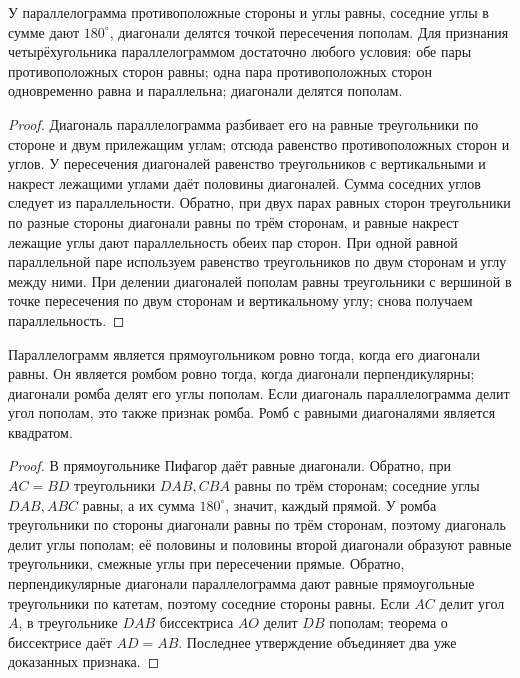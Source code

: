 \begin{theorem}\label{thm:exam-plane-parallelogram}
У параллелограмма противоположные стороны и углы равны, соседние углы в сумме дают \(180^\circ\), диагонали делятся точкой пересечения пополам. Для признания четырёхугольника параллелограммом достаточно любого условия: обе пары противоположных сторон равны; одна пара противоположных сторон одновременно равна и параллельна; диагонали делятся пополам.
\end{theorem}
\begin{proof}Диагональ параллелограмма разбивает его на равные треугольники по стороне и двум прилежащим углам; отсюда равенство противоположных сторон и углов. У пересечения диагоналей равенство треугольников с вертикальными и накрест лежащими углами даёт половины диагоналей. Сумма соседних углов следует из параллельности.
Обратно, при двух парах равных сторон треугольники по разные стороны диагонали равны по трём сторонам, и равные накрест лежащие углы дают параллельность обеих пар сторон. При одной равной параллельной паре используем равенство треугольников по двум сторонам и углу между ними. При делении диагоналей пополам равны треугольники с вершиной в точке пересечения по двум сторонам и вертикальному углу; снова получаем параллельность.\end{proof}
\begin{theorem}
Параллелограмм является прямоугольником ровно тогда, когда его диагонали равны. Он является ромбом ровно тогда, когда диагонали перпендикулярны; диагонали ромба делят его углы пополам. Если диагональ параллелограмма делит угол пополам, это также признак ромба. Ромб с равными диагоналями является квадратом.
\end{theorem}
\begin{proof}В прямоугольнике Пифагор даёт равные диагонали. Обратно, при \(AC=BD\) треугольники \(DAB,CBA\) равны по трём сторонам; соседние углы \(DAB,ABC\) равны, а их сумма \(180^\circ\), значит, каждый прямой. У ромба треугольники по стороны диагонали равны по трём сторонам, поэтому диагональ делит углы пополам; её половины и половины второй диагонали образуют равные треугольники, смежные углы при пересечении прямые. Обратно, перпендикулярные диагонали параллелограмма дают равные прямоугольные треугольники по катетам, поэтому соседние стороны равны. Если \(AC\) делит угол \(A\), в треугольнике \(DAB\) биссектриса \(AO\) делит \(DB\) пополам; теорема о биссектрисе даёт \(AD=AB\). Последнее утверждение объединяет два уже доказанных признака.\end{proof}
